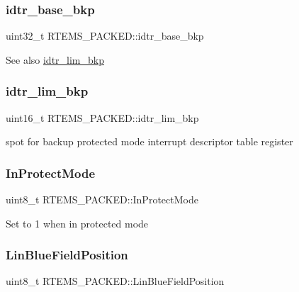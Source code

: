 \subsubsection{\texorpdfstring{idtr\_base\_bkp}{idtr\_base\_bkp}}
{\footnotesize\ttfamily uint32\+\_\+t R\+T\+E\+M\+S\+\_\+\+P\+A\+C\+K\+E\+D\+::idtr\+\_\+base\+\_\+bkp}

\begin{DoxySeeAlso}{See also}
\mbox{\hyperlink{structRTEMS__PACKED_a3ebaf8f47f8f74a6796f9c74e788fd4a}{idtr\+\_\+lim\+\_\+bkp}} 
\end{DoxySeeAlso}
\mbox{\label{structRTEMS__PACKED_a3ebaf8f47f8f74a6796f9c74e788fd4a}} 
\subsubsection{\texorpdfstring{idtr\_lim\_bkp}{idtr\_lim\_bkp}}
{\footnotesize\ttfamily uint16\+\_\+t R\+T\+E\+M\+S\+\_\+\+P\+A\+C\+K\+E\+D\+::idtr\+\_\+lim\+\_\+bkp}

spot for backup protected mode interrupt descriptor table register \mbox{\label{structRTEMS__PACKED_ac04582c79e9ddfb8b6ffd76693f3d8ed}} 
\subsubsection{\texorpdfstring{InProtectMode}{InProtectMode}}
{\footnotesize\ttfamily uint8\+\_\+t R\+T\+E\+M\+S\+\_\+\+P\+A\+C\+K\+E\+D\+::\+In\+Protect\+Mode}

Set to 1 when in protected mode \mbox{\label{structRTEMS__PACKED_ad34bba19366f5fd37bdd217452472ec5}} 
\subsubsection{\texorpdfstring{LinBlueFieldPosition}{LinBlueFieldPosition}}
{\footnotesize\ttfamily uint8\+\_\+t R\+T\+E\+M\+S\+\_\+\+P\+A\+C\+K\+E\+D\+::\+Lin\+Blue\+Field\+Position}

